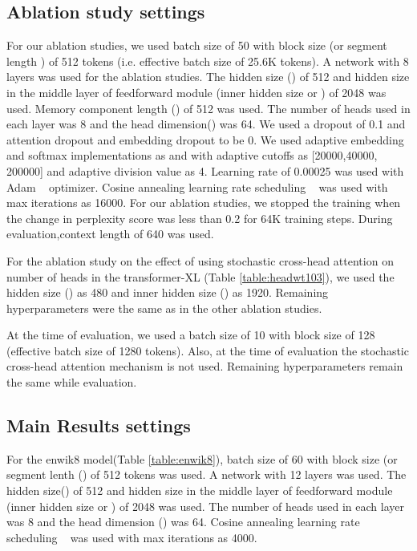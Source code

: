 \documentclass[11pt]{article}
\begin{document}
\subsection{Ablation study settings}
For our ablation studies, we used batch size of 50 with block size (or segment length ) of 512 tokens (i.e. effective batch size of 25.6K tokens). A network with 8 layers was used for the ablation studies. The hidden size () of 512 and hidden size in the middle layer of feedforward module (inner hidden size or ) of 2048 was used. Memory component length () of 512 was used. The number of heads used in each layer was 8 and the head dimension() was 64. We used a dropout of 0.1 and attention dropout and embedding dropout to be 0. We used adaptive embedding and softmax implementations as \citet{DBLP:conf/iclr/BaevskiA19} and \citet{DBLP:conf/icml/GraveJCGJ17} with adaptive cutoffs as [20000,40000, 200000] and adaptive division value as 4. Learning rate of 0.00025 was used with Adam ~\citep{DBLP:journals/corr/KingmaB14} optimizer. Cosine annealing learning rate scheduling ~\citep{DBLP:conf/iclr/LoshchilovH17} was used  with max iterations as 16000. For our ablation studies, we stopped the training when the change in perplexity score was less than 0.2 for 64K training steps. During evaluation,context length of 640 was used.


For the ablation study on the effect of using stochastic cross-head attention on number of heads in the transformer-XL (Table \ref{table:headwt103}), we used the hidden size () as 480 and inner hidden size () as 1920. Remaining hyperparameters were the same as in the other ablation studies.




At the time of evaluation, we used a batch size of 10 with block size of 128 (effective batch size of 1280 tokens). Also, at the time of evaluation the stochastic cross-head attention mechanism is not used. Remaining hyperparameters remain the same while evaluation.

\subsection{Main Results settings}
For the enwik8 model(Table \ref{table:enwik8}), batch size of 60 with block size (or segment lenth () of 512 tokens  was used. A network with 12 layers was used. The hidden size() of 512 and hidden size in the middle layer of feedforward module (inner hidden size or ) of 2048 was used. The number of heads used in each layer was 8 and the head dimension () was 64. Cosine annealing learning rate scheduling ~\citep{DBLP:conf/iclr/LoshchilovH17} was used  with max iterations as 4000.
\end{document}
